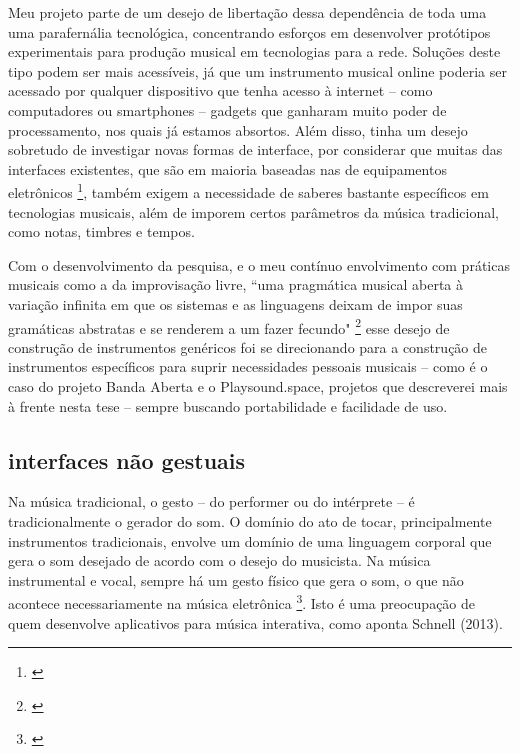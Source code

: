 Meu projeto parte de um desejo de libertação dessa dependência de toda uma uma parafernália tecnológica, concentrando esforços em desenvolver protótipos experimentais para produção musical em tecnologias para a rede. Soluções deste tipo podem ser mais acessíveis, já que um instrumento musical online poderia ser acessado por qualquer dispositivo que tenha acesso à internet -- como computadores ou smartphones -- gadgets que ganharam muito poder de processamento, nos quais já estamos absortos. Além disso, tinha um desejo sobretudo de investigar novas formas de interface, por considerar que muitas das interfaces existentes, que são em maioria baseadas nas de equipamentos eletrônicos \footnote{\cite{Stolfi2016}}, também exigem a necessidade de saberes bastante específicos em tecnologias musicais, além de imporem certos parâmetros da música tradicional, como notas, timbres e tempos. 

Com o desenvolvimento da pesquisa, e o meu contínuo envolvimento com práticas musicais como a da improvisação livre, ``uma pragmática musical aberta à variação infinita em que os sistemas e as linguagens deixam de impor suas gramáticas abstratas e se renderem a um fazer fecundo" \footnote{\cite[2]{Costa2016}} esse desejo de construção de instrumentos genéricos foi se direcionando para a construção de instrumentos específicos para suprir necessidades pessoais musicais -- como é o caso do projeto Banda Aberta e o Playsound.space, projetos que descreverei mais à frente nesta tese -- sempre buscando portabilidade e facilidade de uso.


\subsection{interfaces não gestuais}

Na música tradicional, o gesto -- do performer ou do intérprete -- é tradicionalmente o gerador do som. O domínio do ato de tocar, principalmente instrumentos tradicionais, envolve um domínio de uma linguagem corporal que gera o som desejado de acordo com o desejo do musicista. Na música instrumental e vocal, sempre há um gesto físico que gera o som, o que não acontece necessariamente na música eletrônica \footnote{\cite[85]{Smalley1996}}. Isto é uma preocupação de quem desenvolve aplicativos para música interativa, como aponta Schnell (2013). 


